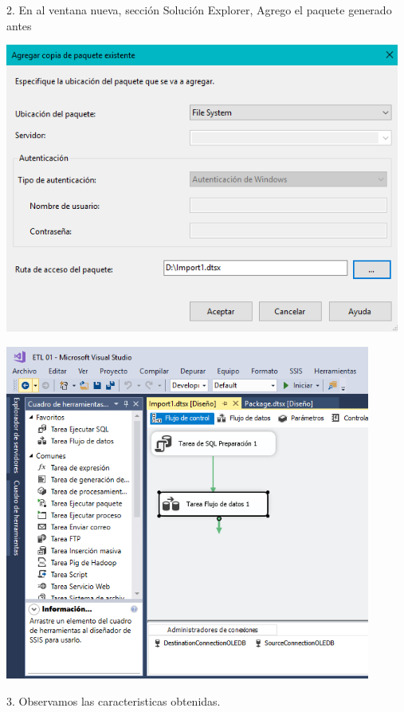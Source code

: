 2. En al ventana nueva, sección Solución Explorer, Agrego el paquete generado antes\\
	\begin{center}
	\includegraphics[width=13cm]{./Imagenes/img14}
	\end{center}	
	\begin{center}
	\includegraphics[width=12cm]{./Imagenes/img15}
	\end{center}	
3. Observamos las caracteristicas obtenidas.\\
